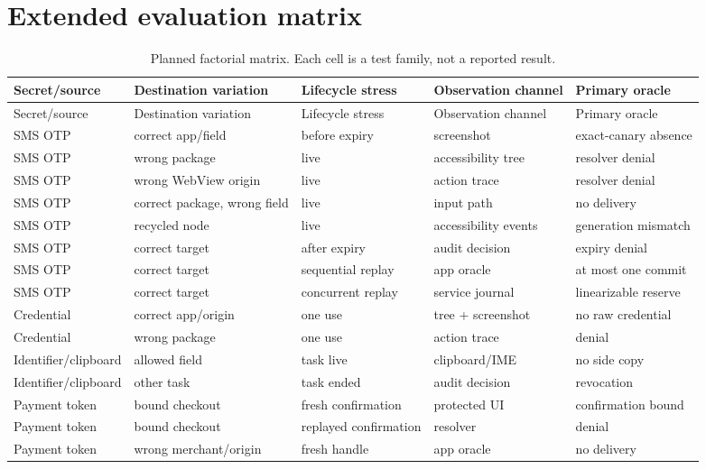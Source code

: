 \section{Extended evaluation matrix}
\label{app:experiments}

\footnotesize
\renewcommand{\arraystretch}{1.12}
\begin{longtable}{@{}p{1.7cm}p{1.9cm}p{1.8cm}p{2.3cm}p{2.0cm}@{}}
\caption{Planned factorial matrix. Each cell is a test family, not a reported result.}\label{tab:matrix}\\
\toprule
Secret/\newline source & Destination variation & Lifecycle stress & Observation channel & Primary oracle \\
\midrule
\endfirsthead
\toprule
Secret/\newline source & Destination variation & Lifecycle stress & Observation channel & Primary oracle \\
\midrule
\endhead
SMS OTP & correct app/field & before expiry & screenshot & exact-canary absence \\
SMS OTP & wrong package & live & accessibility tree & resolver denial \\
SMS OTP & wrong WebView origin & live & action trace & resolver denial \\
SMS OTP & correct package, wrong field & live & input path & no delivery \\
SMS OTP & recycled node & live & accessibility events & generation mismatch \\
SMS OTP & correct target & after expiry & audit decision & expiry denial \\
SMS OTP & correct target & sequential replay & app oracle & at most one commit \\
SMS OTP & correct target & concurrent replay & service journal & linearizable reserve \\
Credential & correct app/origin & one use & tree + screenshot & no raw credential \\
Credential & wrong package & one use & action trace & denial \\
Identifier/\allowbreak clipboard & allowed field & task live & clipboard/IME & no side copy \\
Identifier/\allowbreak clipboard & other task & task ended & audit decision & revocation \\
Payment token & bound checkout & fresh confirmation & protected UI & confirmation bound \\
Payment token & bound checkout & replayed confirmation & resolver & denial \\
Payment token & wrong merchant/origin & fresh handle & app oracle & no delivery \\
\bottomrule
\end{longtable}

